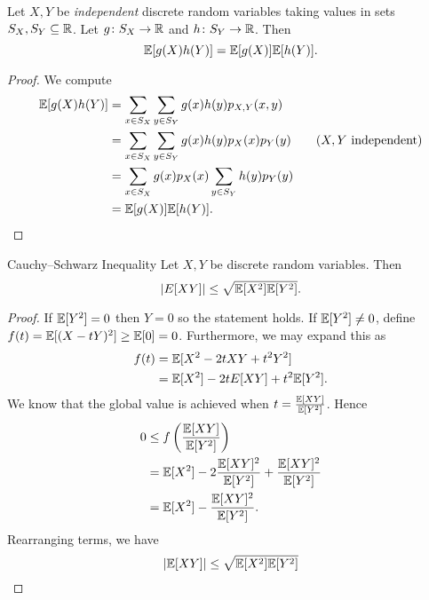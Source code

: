 \documentclass[class=article, crop=false]{standalone}
\begin{document}
  \begin{theorem}{}
    Let $X, Y$ be \emph{independent} discrete random variables taking values in sets $S_X, S_Y\subseteq\mathbb{R}$. Let $g\colon S_X\to \mathbb{R}$ and $h\colon S_Y\to \mathbb{R}$. Then
    \[
      \mathbb{E}[g(X)h(Y)] = \mathbb{E}[g(X)]\mathbb{E}[h(Y)].
    \]
    \begin{proof}
      We compute
      \begin{align*}
        \mathbb{E}[g(X)h(Y)] &= \sum_{x\in S_X}\sum_{y\in S_Y} g(x)h(y) p_{X, Y}(x, y) \\
                     &= \sum_{x\in S_X}\sum_{y\in S_Y} g(x)h(y) p_X(x)p_Y(y) \tag{$X, Y$ independent} \\
                     &= \sum_{x\in S_X}g(x)p_X(x)\sum_{y\in S_Y}h(y)p_Y(y) \\
                     &= \mathbb{E}[g(X)]\mathbb{E}[h(Y)].
      \end{align*}
    \end{proof}
  \end{theorem}
  \begin{theorem}{Cauchy--Schwarz Inequality}
    Let $X, Y$ be discrete random variables. Then
    \[
      \left\lvert E[XY] \right\rvert \leq \sqrt{\mathbb{E}[X^2]\mathbb{E}[Y^2]}.
    \]
    \begin{proof}
      If $\mathbb{E}[Y^2] = 0$ then $Y = 0$ so the statement holds. If $\mathbb{E}[Y^2]\neq 0$, define $f(t) = \mathbb{E}[(X - tY)^2] \geq \mathbb{E}[0] = 0$. Furthermore, we may expand this as
      \begin{align*}
        f(t) &= \mathbb{E}[X^2 - 2tXY + t^2Y^2] \\ 
             &= \mathbb{E}[X^2] - 2tE[XY] + t^2\mathbb{E}[Y^2].
      \end{align*}
      We know that the global value is achieved when $t = \frac{\mathbb{E}[XY]}{\mathbb{E}[Y^2]}$. Hence
      \begin{align*}
        0 &\leq f\left( \frac{\mathbb{E}[XY]}{\mathbb{E}[Y^2]} \right) \\
          &= \mathbb{E}[X^2] - 2 \frac{\mathbb{E}[XY]^2}{\mathbb{E}[Y^2]} + \frac{\mathbb{E}[XY]^2}{\mathbb{E}[Y^2]} \\
          &= \mathbb{E}[X^2] - \frac{\mathbb{E}[XY]^2}{\mathbb{E}[Y^2]}.
      \end{align*}
      Rearranging terms, we have
      \[
        \left\lvert \mathbb{E}[XY] \right\rvert \leq \sqrt{\mathbb{E}[X^2]\mathbb{E}[Y^2]}
      \]
    \end{proof}
  \end{theorem}
\end{document}
